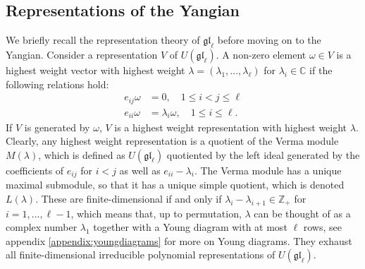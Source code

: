 \documentclass[11pt]{report}
\theoremstyle{definition}
\newtheorem{definition}[theorem]{Definition}
\theoremstyle{remark}
\theoremstyle{remark}
\newcommand{\End}{\operatorname{End}}
\newcommand{\Z}{\mathbb{Z}}
\newcommand{\C}{\mathbb{C}}
\begin{document}
%
 
\subsection{Representations of the Yangian}

We briefly recall the representation theory of $\mathfrak{gl}_\ell$ before moving on to the Yangian. Consider a representation $V$ of $U(\mathfrak{gl}_\ell)$. A non-zero element $\omega \in V$ is a highest weight vector with highest weight $\lambda = (\lambda_1,...,\lambda_\ell)$ for $\lambda_i \in \C$ if the following relations hold:
\begin{align*}
e_{ij} \omega &= 0, \quad 1 \leq i < j \leq \ell \\
e_{ii} \omega &= \lambda_i \omega, \quad 1 \leq i \leq \ell.
\end{align*}
If $V$ is generated by $\omega$, $V$ is a highest weight representation with highest weight $\lambda$. Clearly, any highest weight representation is a quotient of the Verma module $M(\lambda)$, which is defined as $U(\mathfrak{gl}_\ell)$ quotiented by the left ideal generated by the coefficients of $e_{ij}$ for $i<j$ as well as $e_{ii} - \lambda_i$. The Verma module has a unique maximal submodule, so that it has a unique simple quotient, which is denoted $L(\lambda)$. These are finite-dimensional if and only if $\lambda_i - \lambda_{i+1} \in \Z_+$ for $i=1,...,\ell-1$, which means that, up to permutation, $\lambda$ can be thought of as a complex number $\lambda_1$ together with a Young diagram with at most $\ell$ rows, see appendix \ref{appendix:youngdiagrams} for more on Young diagrams. They exhaust all finite-dimensional irreducible polynomial representations of $U(\mathfrak{gl}_\ell)$.
\end{document}
